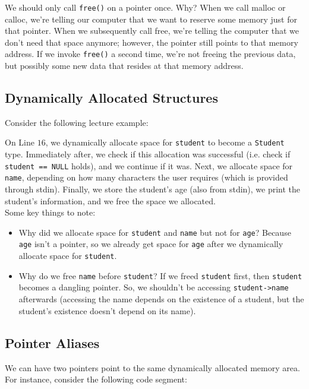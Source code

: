 We should only call \verb!free()! on a pointer once. Why? When we call malloc or calloc, we're telling our computer that we want to reserve some memory just for that pointer. When we subsequently call free, we're telling the computer that we don't need that space anymore; however, the pointer still points to that memory address. If we invoke \verb!free()! a second time, we're not freeing the previous data, but possibly some new data that resides at that memory address.

\subsection{Dynamically Allocated Structures}
Consider the following lecture example:

\begin{center}

\end{center}


On Line $16$, we dynamically allocate space for \verb!student! to become a \verb!Student! type. Immediately after, we check if this allocation was successful (i.e. check if \verb!student == NULL! holds), and we continue if it was. Next, we allocate space for \verb!name!, depending on how many characters the user requires (which is provided through stdin). Finally, we store the student's age (also from stdin), we print the student's information, and we free the space we allocated. \\

Some key things to note: \begin{itemize}
    \item Why did we allocate space for \verb!student! and \verb!name! but not for \verb!age!? Because \verb!age! isn't a pointer, so we already get space for \verb!age! after we dynamically allocate space for \verb!student!. 
    \item Why do we free \verb!name! before \verb!student!? If we freed \verb!student! first, then \verb!student! becomes a dangling pointer. So, we shouldn't be accessing \verb!student->name! afterwards (accessing the name depends on the existence of a student, but the student's existence doesn't depend on its name).  
\end{itemize}


\subsection{Pointer Aliases}
We can have two pointers point to the same dynamically allocated memory area. For instance, consider the following code segment:

